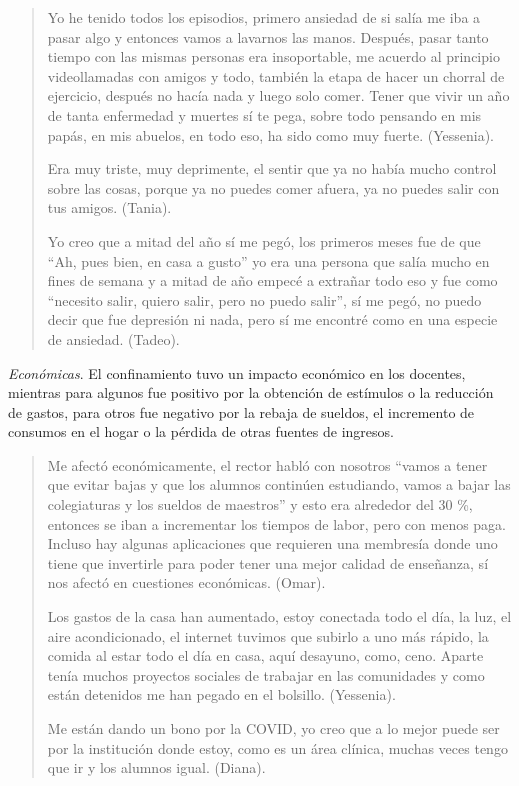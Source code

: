 \documentclass[spanish]{textolivre}
\begin{document}
\begin{quote}
    Yo he tenido todos los episodios, primero ansiedad de si salía me iba a pasar algo y entonces vamos a lavarnos las manos. Después, pasar tanto tiempo con las mismas personas era insoportable, me acuerdo al principio videollamadas con amigos y todo, también la etapa de hacer un chorral de ejercicio, después no hacía nada y luego solo comer. Tener que vivir un año de tanta enfermedad y muertes sí te pega, sobre todo pensando en mis papás, en mis abuelos, en todo eso, ha sido como muy fuerte. (Yessenia).
    
    Era muy triste, muy deprimente, el sentir que ya no había mucho control sobre las cosas, porque ya no puedes comer afuera, ya no puedes salir con tus amigos. (Tania).
    
    Yo creo que a mitad del año sí me pegó, los primeros meses fue de que “Ah, pues bien, en casa a gusto” yo era una persona que salía mucho en fines de semana y a mitad de año empecé a extrañar todo eso y fue como “necesito salir, quiero salir, pero no puedo salir”, sí me pegó, no puedo decir que fue depresión ni nada, pero sí me encontré como en una especie de ansiedad. (Tadeo).
\end{quote}

\textit{Económicas}. El confinamiento tuvo un impacto económico en los docentes, mientras para algunos fue positivo por la obtención de estímulos o la reducción de gastos, para otros fue negativo por la rebaja de sueldos, el incremento de consumos en el hogar o la pérdida de otras fuentes de ingresos. 

\begin{quote}
    Me afectó económicamente, el rector habló con nosotros “vamos a tener que evitar bajas y que los alumnos continúen estudiando, vamos a bajar las colegiaturas y los sueldos de maestros” y esto era alrededor del 30 \%, entonces se iban a incrementar los tiempos de labor, pero con menos paga. Incluso hay algunas aplicaciones que requieren una membresía donde uno tiene que invertirle para poder tener una mejor calidad de enseñanza, sí nos afectó en cuestiones económicas. (Omar).
    
    Los gastos de la casa han aumentado, estoy conectada todo el día, la luz, el aire acondicionado, el internet tuvimos que subirlo a uno más rápido, la comida al estar todo el día en casa, aquí desayuno, como, ceno. Aparte tenía muchos proyectos sociales de trabajar en las comunidades y como están detenidos me han pegado en el bolsillo. (Yessenia).
    
    Me están dando un bono por la  COVID, yo creo que a lo mejor puede ser por la institución donde estoy, como es un área clínica, muchas veces tengo que ir y los alumnos igual. (Diana).
\end{quote}
\end{document}
